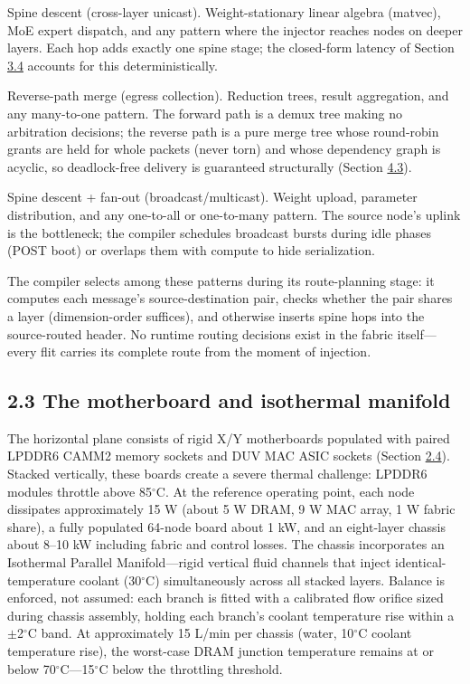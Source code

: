 \documentclass[10pt,twocolumn]{article}
\begin{document}
Spine descent (cross-layer unicast). Weight-stationary linear algebra (matvec), MoE expert dispatch, and any pattern where the injector reaches nodes on deeper layers. Each hop adds exactly one spine stage; the closed-form latency of Section \hyperref[sec:3.4]{3.4} accounts for this deterministically.

Reverse-path merge (egress collection). Reduction trees, result aggregation, and any many-to-one pattern. The forward path is a demux tree making no arbitration decisions; the reverse path is a pure merge tree whose round-robin grants are held for whole packets (never torn) and whose dependency graph is acyclic, so deadlock-free delivery is guaranteed structurally (Section \hyperref[sec:4.3]{4.3}).

Spine descent + fan-out (broadcast/multicast). Weight upload, parameter distribution, and any one-to-all or one-to-many pattern. The source node's uplink is the bottleneck; the compiler schedules broadcast bursts during idle phases (POST boot) or overlaps them with compute to hide serialization.

The compiler selects among these patterns during its route-planning stage: it computes each message's source-destination pair, checks whether the pair shares a layer (dimension-order suffices), and otherwise inserts spine hops into the source-routed header. No runtime routing decisions exist in the fabric itself---every flit carries its complete route from the moment of injection.

\subsection*{2.3 The motherboard and isothermal manifold}\label{sec:2.3}

The horizontal plane consists of rigid X/Y motherboards populated with paired LPDDR6 CAMM2 memory sockets and DUV MAC ASIC sockets (Section \hyperref[sec:2.4]{2.4}). Stacked vertically, these boards create a severe thermal challenge: LPDDR6 modules throttle above 85$^\circ$C. At the reference operating point, each node dissipates approximately 15 W (about 5 W DRAM, 9 W MAC array, 1 W fabric share), a fully populated 64-node board about 1 kW, and an eight-layer chassis about 8--10 kW including fabric and control losses. The chassis incorporates an Isothermal Parallel Manifold---rigid vertical fluid channels that inject identical-temperature coolant (30$^\circ$C) simultaneously across all stacked layers. Balance is enforced, not assumed: each branch is fitted with a calibrated flow orifice sized during chassis assembly, holding each branch's coolant temperature rise within a $\pm$2$^\circ$C band. At approximately 15 L/min per chassis (water, 10$^\circ$C coolant temperature rise), the worst-case DRAM junction temperature remains at or below 70$^\circ$C---15$^\circ$C below the throttling threshold.
\end{document}
